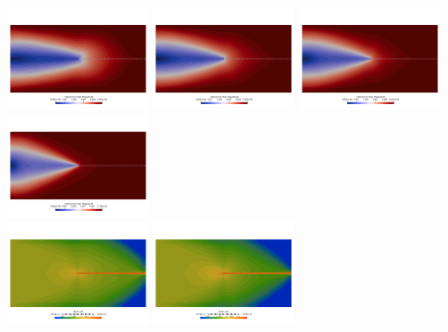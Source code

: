 \begin{center}
\includegraphics[width=4.2cm]{python_codes/fieldstone_87/results/experiment_07/vel_n01}
\includegraphics[width=4.2cm]{python_codes/fieldstone_87/results/experiment_07/vel_n02}
\includegraphics[width=4.2cm]{python_codes/fieldstone_87/results/experiment_07/vel_n03}
\includegraphics[width=4.2cm]{python_codes/fieldstone_87/results/experiment_07/vel_n10}\\
\includegraphics[width=4.2cm]{python_codes/fieldstone_87/results/experiment_07/sr_n01}
\includegraphics[width=4.2cm]{python_codes/fieldstone_87/results/experiment_07/sr_n02}

\end{center}
